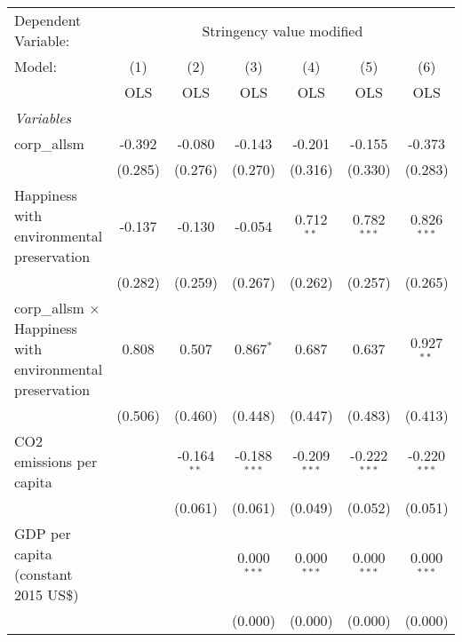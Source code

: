 
\begingroup
\centering
\begin{tabular}{lcccccc}
   \toprule
   Dependent Variable: & \multicolumn{6}{c}{Stringency value modified}\\
   Model:                                                           & (1)     & (2)           & (3)            & (4)            & (5)            & (6)\\  
                                                                    &  OLS    & OLS           & OLS            & OLS            & OLS            & OLS\\  
   \midrule
   \emph{Variables}\\
   corp\_allsm                                                      & -0.392  & -0.080        & -0.143         & -0.201         & -0.155         & -0.373\\   
                                                                    & (0.285) & (0.276)       & (0.270)        & (0.316)        & (0.330)        & (0.283)\\   
   Happiness with environmental preservation                        & -0.137  & -0.130        & -0.054         & 0.712$^{**}$   & 0.782$^{***}$  & 0.826$^{***}$\\   
                                                                    & (0.282) & (0.259)       & (0.267)        & (0.262)        & (0.257)        & (0.265)\\   
   corp\_allsm $\times$ Happiness with environmental preservation   & 0.808   & 0.507         & 0.867$^{*}$    & 0.687          & 0.637          & 0.927$^{**}$\\   
                                                                    & (0.506) & (0.460)       & (0.448)        & (0.447)        & (0.483)        & (0.413)\\   
   CO2 emissions per capita                                         &         & -0.164$^{**}$ & -0.188$^{***}$ & -0.209$^{***}$ & -0.222$^{***}$ & -0.220$^{***}$\\   
                                                                    &         & (0.061)       & (0.061)        & (0.049)        & (0.052)        & (0.051)\\   
   GDP per capita (constant 2015 US\$)                              &         &               & 0.000$^{***}$  & 0.000$^{***}$  & 0.000$^{***}$  & 0.000$^{***}$\\   
                                                                    &         &               & (0.000)        & (0.000)        & (0.000)        & (0.000)\\   

\end{tabular}
